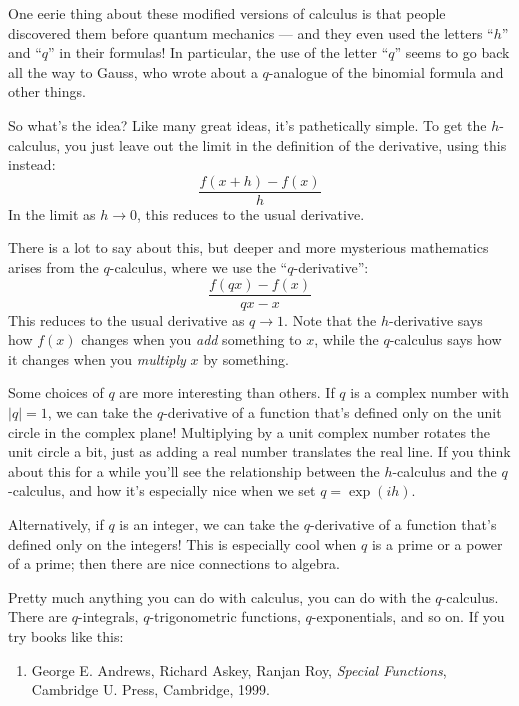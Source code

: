 \documentclass{article}
\def\tightlist{}
\begin{document}
One eerie thing about these modified versions of calculus is that people
discovered them before quantum mechanics --- and they even used the
letters ``\(h\)'' and ``\(q\)'' in their formulas! In particular, the
use of the letter ``\(q\)'' seems to go back all the way to Gauss, who
wrote about a \(q\)-analogue of the binomial formula and other things.

So what's the idea? Like many great ideas, it's pathetically simple. To
get the \(h\)-calculus, you just leave out the limit in the definition
of the derivative, using this instead: \[\frac{f(x+h)-f(x)}{h}\] In the
limit as \(h \to 0\), this reduces to the usual derivative.

There is a lot to say about this, but deeper and more mysterious
mathematics arises from the \(q\)-calculus, where we use the
``\(q\)-derivative'': \[\frac{f(qx)-f(x)}{qx-x}\] This reduces to the
usual derivative as \(q \to 1\). Note that the \(h\)-derivative says how
\(f(x)\) changes when you \emph{add} something to \(x\), while the
\(q\)-calculus says how it changes when you \emph{multiply} \(x\) by
something.

Some choices of \(q\) are more interesting than others. If \(q\) is a
complex number with \(|q| = 1\), we can take the \(q\)-derivative of a
function that's defined only on the unit circle in the complex plane!
Multiplying by a unit complex number rotates the unit circle a bit, just
as adding a real number translates the real line. If you think about
this for a while you'll see the relationship between the \(h\)-calculus
and the \(q\)-calculus, and how it's especially nice when we set
\(q = \exp(ih)\).

Alternatively, if \(q\) is an integer, we can take the \(q\)-derivative
of a function that's defined only on the integers! This is especially
cool when \(q\) is a prime or a power of a prime; then there are nice
connections to algebra.

Pretty much anything you can do with calculus, you can do with the
\(q\)-calculus. There are \(q\)-integrals, \(q\)-trigonometric
functions, \(q\)-exponentials, and so on. If you try books like this:

\begin{enumerate}
\def\labelenumi{\arabic{enumi})}
\setcounter{enumi}{1}
\tightlist
\item
  George E. Andrews, Richard Askey, Ranjan Roy, \emph{Special
  Functions}, Cambridge U. Press, Cambridge, 1999.
\end{enumerate}
\end{document}
